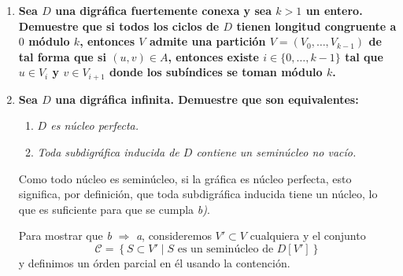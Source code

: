 \documentclass{article}
\newcommand{\set}[1]{\left\{ #1 \right\}}
\begin{document}
\begin{enumerate}
    Sea $D$ una digr\'afica con dos n\'ucleos distintos $N_1,N_2$, definamos $K_1=N_1-N_2$, $K_2=N_2-N_1$, luego, $K=K_1\cup K_2$, notemos que como los n\'ucleos son diferentes, entonces $K\neq\emptyset$. Consideremos $D'=D[K]$.

    Sea $v\in K$, podemos considerar, sin p\'erdida de la generalidad $v\in K_1$, luego, como $v\notin N_2$ por \'este segundo ser un n\'ucleo debe existir $w\in N_2$ tal que $(v,w)\in A_D$, y por \'esta adyacencia, se tiene que $w\notin N_1$, por lo tanto $w\in N_2-N_1=K_2\subset K$, es decir $w\in K$.

    De aqu\'i se tiene que $\forall v\in K$ existe $w\in K$ tal que $(v,w)\in A(D)$, es decir $\forall v\in K (d^+_{D'}(v)\geq 1)$, por lo tanto $D'$ tiene un ciclo. Observemos que $K_1$ y $K_2$ son conjuntos independientes, ajenos, y tales que $K=K_1\cup K_2$, entonces \'esta es una bipartici\'on de $D'$. Por lo tanto el ciclo debe ser par. Como $D'$ es una subdigr\'afica inducida, entonces $D$ tiene un ciclo par.

  \item \textbf{Sea $D$ una digr\'afica fuertemente conexa y sea $k > 1$ un entero.
    Demuestre que si todos los ciclos de $D$ tienen longitud congruente a
    $0$ m\'odulo $k$, entonces $V$ admite una partici\'on $V = (V_0, \dots,
    V_{k-1})$ de tal forma que si $(u,v) \in A$, entonces existe $i \in
    \{ 0, \dots, k-1 \}$ tal que $u \in V_i$ y $v \in V_{i+1}$ donde los
    sub\'indices se toman m\'odulo $k$.}

  \item \textbf{Sea $D$ una digr\'afica infinita.  Demuestre que son equivalentes:}
    \begin{enumerate}
      \item \textit{$D$ es n\'ucleo perfecta.}

      \item \textit{Toda subdigr\'afica inducida de $D$ contiene un semin\'ucleo no
        vac\'io.}
    \end{enumerate}

    Como todo n\'ucleo es semin\'ucleo, si la gr\'afica es n\'ucleo perfecta, esto significa, por definici\'on, que toda subdigr\'afica inducida tiene un n\'ucleo, lo que es suficiente para que se cumpla \textit{b)}.

    Para mostrar que \textit{b} $\Rightarrow$ \textit{a}, consideremos $V'\subset V$ cualquiera y el conjunto
    $$\mathcal{C}=\set{S\subset V'\mid S \textrm{ es un semin\'ucleo de  } D[V']}$$
    y definimos un \'orden parcial en \'el usando la contenci\'on.


\end{enumerate}
\end{document}
